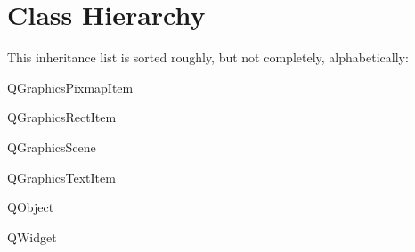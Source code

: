 \section{Class Hierarchy}
This inheritance list is sorted roughly, but not completely, alphabetically\+:\begin{DoxyCompactList}
\item {}
\item Q\+Graphics\+Pixmap\+Item\begin{DoxyCompactList}
\item {}
\item {}
\item {}
\end{DoxyCompactList}
\item Q\+Graphics\+Rect\+Item\begin{DoxyCompactList}
\item {}
\end{DoxyCompactList}
\item Q\+Graphics\+Scene\begin{DoxyCompactList}
\item {}
\item {}
\end{DoxyCompactList}
\item Q\+Graphics\+Text\+Item\begin{DoxyCompactList}
\item {}
\end{DoxyCompactList}
\item Q\+Object\begin{DoxyCompactList}
\item {}
\item {}
\item {}
\item {}
\end{DoxyCompactList}
\item Q\+Widget\begin{DoxyCompactList}

\end{DoxyCompactList}
\end{DoxyCompactList}
